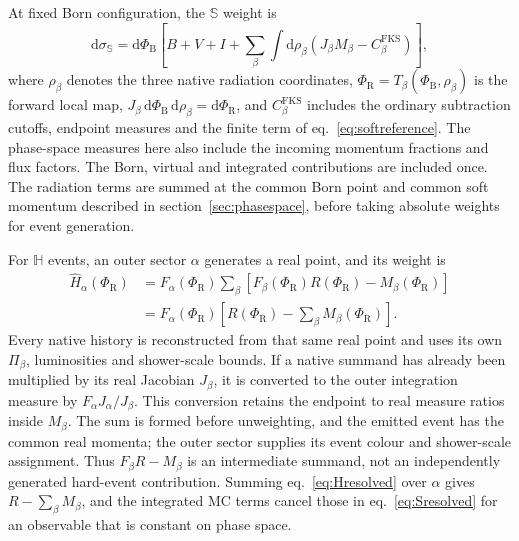 \documentclass[a4paper,11pt]{article}
\newcommand{\dd}{\mathrm{d}}
\newcommand{\clS}{\mathbb{S}}
\newcommand{\clH}{\mathbb{H}}
\newcommand{\PhiB}{\Phi_{\mathrm{B}}}
\newcommand{\PhiR}{\Phi_{\mathrm{R}}}
\begin{document}
At fixed Born configuration, the $\clS$ weight is
\begin{equation}
 \dd\sigma_{\clS}=\dd\PhiB\left[
 B+V+I+\sum_\beta\int\dd\rho_\beta
 \left(J_\beta M_\beta-C^{\mathrm{FKS}}_\beta\right)\right],
 \label{eq:Sresolved}
\end{equation}
where $\rho_\beta$ denotes the three native radiation coordinates,
$\PhiR=T_\beta(\PhiB,\rho_\beta)$ is the forward local map,
$J_\beta\,\dd\PhiB\,\dd\rho_\beta=\dd\PhiR$, and
$C^{\mathrm{FKS}}_\beta$ includes the ordinary subtraction cutoffs,
endpoint measures and the finite term of eq.~\eqref{eq:softreference}.
The phase-space measures here also include the incoming momentum
fractions and flux factors. The Born, virtual and integrated
contributions are included once. The radiation terms are summed at
the common Born point and common soft momentum described in
section~\ref{sec:phasespace}, before taking absolute weights for event
generation.

For $\clH$ events, an outer sector $\alpha$ generates a real point,
and its weight is
\begin{align}
 \widehat H_\alpha(\PhiR)
 &=F_\alpha(\PhiR)\sum_\beta
 \left[F_\beta(\PhiR)R(\PhiR)-M_\beta(\PhiR)\right]\nonumber\\
 &=F_\alpha(\PhiR)\left[R(\PhiR)-\sum_\beta M_\beta(\PhiR)\right].
 \label{eq:Hresolved}
\end{align}
Every native history is reconstructed from that same real point and
uses its own $\Pi_\beta$, luminosities and shower-scale bounds. If a
native summand has already been multiplied by its real Jacobian
$J_\beta$, it is converted to the outer integration measure by
$F_\alpha J_\alpha/J_\beta$. This conversion retains the endpoint to
real measure ratios inside $M_\beta$. The sum is formed before
unweighting, and the emitted event has the common real momenta; the
outer sector supplies its event colour and shower-scale assignment.
Thus $F_\beta R-M_\beta$ is an intermediate summand, not an
independently generated hard-event contribution. Summing
eq.~\eqref{eq:Hresolved} over $\alpha$ gives
$R-\sum_\beta M_\beta$, and the integrated MC terms cancel those in
eq.~\eqref{eq:Sresolved} for an observable that is constant on phase
space.
\end{document}
